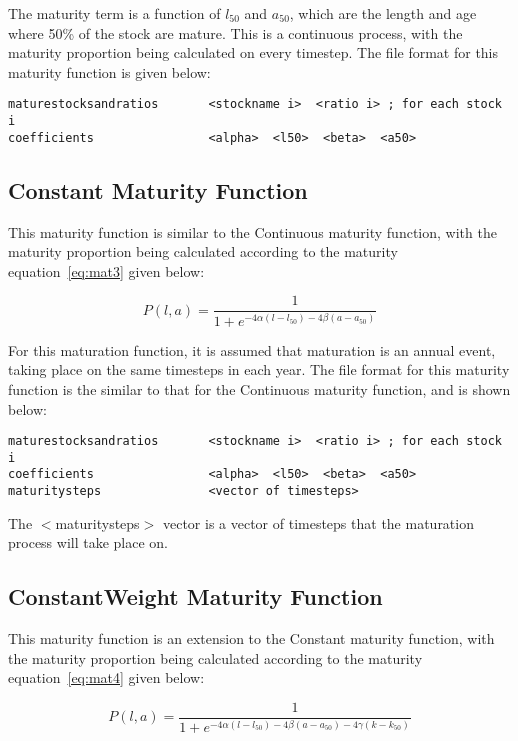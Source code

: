\documentclass[10pt,twoside]{book}
\begin{document}
\bigskip
The maturity term is a function of $l_{50}$ and $a_{50}$, which are the length and age where 50\% of the stock are mature.  This is a continuous process, with the maturity proportion being calculated on every timestep.  The file format for this maturity function is given below:

{\small\begin{verbatim}
maturestocksandratios       <stockname i>  <ratio i> ; for each stock i
coefficients                <alpha>  <l50>  <beta>  <a50>
\end{verbatim}}

\subsection{Constant Maturity Function}
This maturity function is similar to the Continuous maturity function, with the maturity proportion being calculated according to the maturity equation~\ref{eq:mat3} given below:

\begin{equation}\label{eq:mat3}
P(l, a) = \frac{1}{ 1 + e^{-4\alpha(l - l_{50}) -4\beta(a - a_{50})}}
\end{equation}

For this maturation function, it is assumed that maturation is an annual event, taking place on the same timesteps in each year.  The file format for this maturity function is the similar to that for the Continuous maturity function, and is shown below:

{\small\begin{verbatim}
maturestocksandratios       <stockname i>  <ratio i> ; for each stock i
coefficients                <alpha>  <l50>  <beta>  <a50>
maturitysteps               <vector of timesteps>
\end{verbatim}}

The $<$maturitysteps$>$ vector is a vector of timesteps that the maturation process will take place on.

\subsection{ConstantWeight Maturity Function}
This maturity function is an extension to the Constant maturity function, with the maturity proportion being calculated according to the maturity equation~\ref{eq:mat4} given below:

\begin{equation}\label{eq:mat4}
P(l, a) = \frac{1}{ 1 + e^{-4\alpha(l - l_{50}) -4\beta(a - a_{50}) -4\gamma(k - k_{50})}}
\end{equation}
\end{document}
